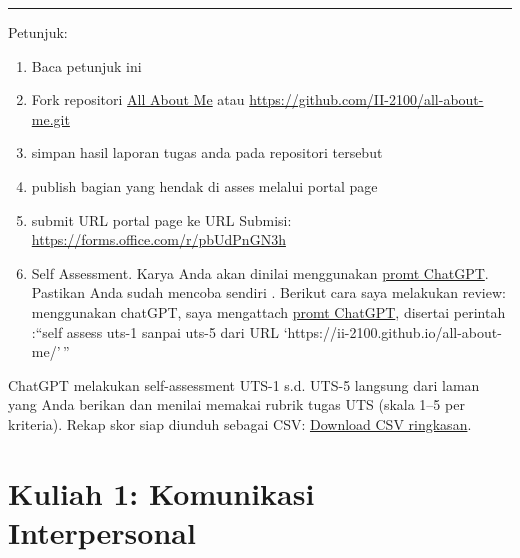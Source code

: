 \documentclass[
  letterpaper,
  DIV=11,
  numbers=noendperiod]{scrreprt}
\begin{document}
\begin{center}\rule{0.5\linewidth}{0.5pt}\end{center}

\begin{tcolorbox}[enhanced jigsaw, left=2mm, colframe=quarto-callout-important-color-frame, title=\textcolor{quarto-callout-important-color}{\faExclamation}\hspace{0.5em}{Important}, coltitle=black, colback=white, toprule=.15mm, bottomrule=.15mm, rightrule=.15mm, opacitybacktitle=0.6, breakable, toptitle=1mm, leftrule=.75mm, titlerule=0mm, colbacktitle=quarto-callout-important-color!10!white, arc=.35mm, bottomtitle=1mm, opacityback=0]

Petunjuk:

\begin{enumerate}
\def\labelenumi{\arabic{enumi}.}
\item
  Baca petunjuk ini
\item
  Fork repositori \href{https://github.com/II-2100/all-about-me.git}{All
  About Me} atau \url{https://github.com/II-2100/all-about-me.git}
\item
  simpan hasil laporan tugas anda pada repositori tersebut
\item
  publish bagian yang hendak di asses melalui portal page
\item
  submit URL portal page ke URL Submisi:
  \url{https://forms.office.com/r/pbUdPnGN3h}
\item
  Self Assessment. Karya Anda akan dinilai menggunakan
  \href{asesmen/skor_uts.pdf}{promt ChatGPT}. Pastikan Anda sudah
  mencoba sendiri . Berikut cara saya melakukan review: menggunakan
  chatGPT, saya mengattach \href{asesmen/skor_uts.pdf}{promt ChatGPT},
  disertai perintah :``self assess uts-1 sanpai uts-5 dari URL
  `https://ii-2100.github.io/all-about-me/'\,''
\end{enumerate}

ChatGPT melakukan self-assessment UTS-1 s.d. UTS-5 langsung dari laman
yang Anda berikan dan menilai memakai rubrik tugas UTS (skala 1--5 per
kriteria). Rekap skor siap diunduh sebagai CSV:
\href{sandbox:/mnt/data/UTS_self_assessment.csv}{Download CSV
ringkasan}.

\end{tcolorbox}


\chapter{Kuliah 1: Komunikasi
Interpersonal}\label{kuliah-1-komunikasi-interpersonal}
\end{document}
